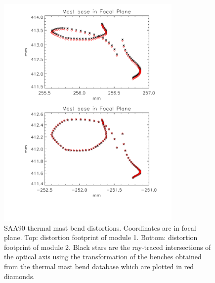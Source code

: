 \begin{figure}[tb]
\begin{center}
\includegraphics[width=0.8\textwidth]{images/saa90mastbend1.pdf}
\caption{SAA90 thermal mast bend distortions. Coordinates are in focal plane. Top: distortion footprint of module 1. Bottom: distortion footprint of module 2. Black stars are the ray-traced intersections of the optical axis using the transformation of the benches obtained from the thermal mast bend database which are plotted in red diamonds.}
\label{saa90sim}
\end{center}
\end{figure}

